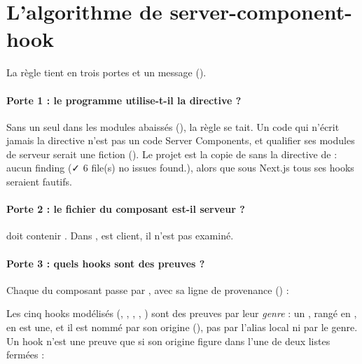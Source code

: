 \section{L'algorithme de server-component-hook}
\label{sec:regles-rendu-rsc-sch}

La règle tient en trois portes et un message ().

\paragraph{Porte 1 : le programme utilise-t-il la directive ?} Sans un seul 
dans les modules abaissés (), la règle se tait. Un code qui
n'écrit jamais la directive n'est pas un code Server Components, et qualifier ses modules de
\og serveur\fg{} serait une fiction (). Le projet
 est la copie de  sans la directive de  : aucun
finding (\og ✓ 6 file(s) no issues found.\fg{}), alors que sous Next.js tous ses hooks seraient
fautifs.

\paragraph{Porte 2 : le fichier du composant est-il serveur ?}  doit
contenir . Dans ,  est client, il n'est pas examiné.

\paragraph{Porte 3 : quels hooks sont des preuves ?} Chaque  du composant passe
par , avec sa ligne de provenance () :


Les cinq hooks modélisés (, , , , )
sont des preuves par leur \emph{genre} : un , rangé en , en est une,
et il est nommé par son origine (), pas par l'alias local ni par le genre. Un
hook  n'est une preuve que si son origine figure dans l'une de deux listes fermées :



